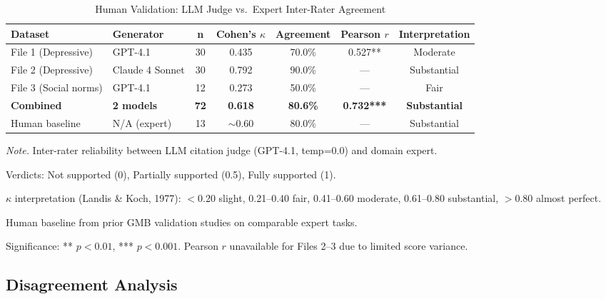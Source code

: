 \begin{table}[H]
\centering
\caption{Human Validation: LLM Judge vs.\ Expert Inter-Rater Agreement}
\label{tab:human_validation}
\begin{threeparttable}
\begin{tabular}{llccccc}
\toprule
\textbf{Dataset} & \textbf{Generator} & \textbf{n} & \textbf{Cohen's $\kappa$} & \textbf{Agreement} & \textbf{Pearson $r$} & \textbf{Interpretation} \\
\midrule
File 1 (Depressive) & GPT-4.1 & 30 & 0.435 & 70.0\% & 0.527** & Moderate \\
File 2 (Depressive) & Claude 4 Sonnet & 30 & 0.792 & 90.0\% & --- & Substantial \\
File 3 (Social norms) & GPT-4.1 & 12 & 0.273 & 50.0\% & --- & Fair \\
\midrule
\textbf{Combined} & \textbf{2 models} & \textbf{72} & \textbf{0.618} & \textbf{80.6\%} & \textbf{0.732***} & \textbf{Substantial} \\
\midrule
Human baseline & N/A (expert) & 13 & $\sim$0.60 & 80.0\% & --- & Substantial \\
\bottomrule
\end{tabular}
\begin{tablenotes}
\small
\item \textit{Note.} Inter-rater reliability between LLM citation judge (GPT-4.1, temp=0.0) and domain expert.
\item Verdicts: Not supported (0), Partially supported (0.5), Fully supported (1).
\item $\kappa$ interpretation (Landis \& Koch, 1977): $<$0.20 slight, 0.21--0.40 fair, 0.41--0.60 moderate, 0.61--0.80 substantial, $>$0.80 almost perfect.
\item Human baseline from prior GMB validation studies on comparable expert tasks.
\item Significance: ** $p<0.01$, *** $p<0.001$. Pearson $r$ unavailable for Files 2--3 due to limited score variance.
\end{tablenotes}
\end{threeparttable}
\end{table}

\subsection{Disagreement Analysis}

